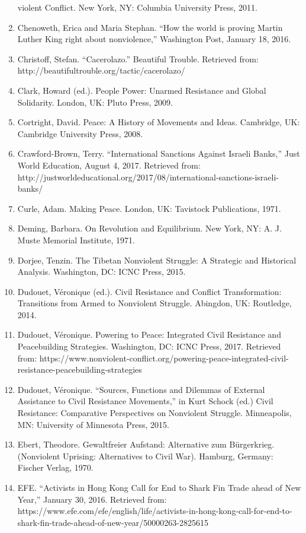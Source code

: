\documentclass[twoside,a4paper,12pt,fleqn,openany]{extbook}
\begin{document}
\begin{enumerate}
violent Conflict. New York, NY: Columbia University Press, 2011.
\item Chenoweth, Erica and Maria Stephan. “How the world is proving Martin Luther King right about nonviolence,” Washington Post, January 18, 2016.
\item Christoff, Stefan. “Cacerolazo.” Beautiful Trouble. Retrieved from: http://beautifultrouble.org/tactic/cacerolazo/
\item Clark, Howard (ed.). People Power: Unarmed Resistance and Global Solidarity. London, UK:
Pluto Press, 2009.
\item Cortright, David. Peace: A History of Movements and Ideas. Cambridge, UK: Cambridge University Press, 2008.
\item Crawford-Brown, Terry. “International Sanctions Against Israeli Banks,” Just World Education, August 4, 2017. Retrieved from: http://justworldeducational.org/2017/08/international-sanctions-israeli-banks/
\item Curle, Adam. Making Peace. London, UK: Tavistock Publications, 1971.
\item Deming, Barbara. On Revolution and Equilibrium. New York, NY: A. J. Muste Memorial Institute, 1971.
\item Dorjee, Tenzin. The Tibetan Nonviolent Struggle: A Strategic and Historical Analysis. Washington, DC: ICNC Press, 2015.
\item Dudouet, Véronique (ed.). Civil Resistance and Conflict Transformation: Transitions from Armed to Nonviolent Struggle. Abingdon, UK: Routledge, 2014.
\item Dudouet, Véronique. Powering to Peace: Integrated Civil Resistance and Peacebuilding Strategies. Washington, DC: ICNC Press, 2017. Retrieved from: https://www.nonviolent-conflict.org/powering-peace-integrated-civil-resistance-peacebuilding-strategies
\item Dudouet, Véronique. “Sources, Functions and Dilemmas of External Assistance to Civil Resistance Movements,” in Kurt Schock (ed.) Civil Resistance: Comparative Perspectives on Nonviolent Struggle. Minneapolis, MN: University of Minnesota Press, 2015.
\item Ebert, Theodore. Gewaltfreier Aufstand: Alternative zum Bürgerkrieg. (Nonviolent Uprising: Alternatives to Civil War). Hamburg, Germany: Fischer Verlag, 1970.
\item EFE. “Activists in Hong Kong Call for End to Shark Fin Trade ahead of New Year,” January 30, 2016. Retrieved from: https://www.efe.com/efe/english/life/activists-in-hong-kong-call-for-end-to-shark-fin-trade-ahead-of-new-year/50000263-2825615

\end{enumerate}
\end{document}
